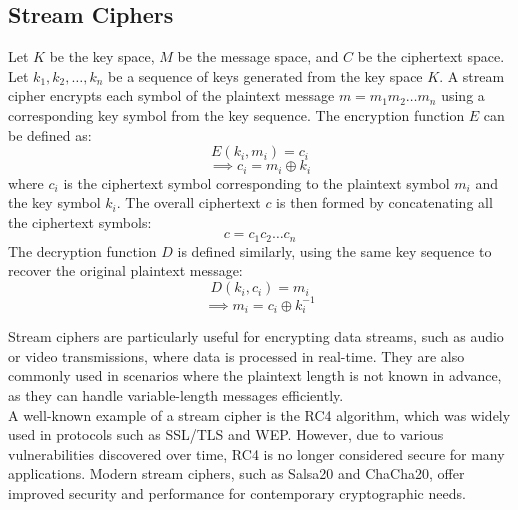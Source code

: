 \documentclass[openany]{book}
\begin{document}
\subsection{Stream Ciphers}
Let $K$ be the key space, $M$ be the message space, and $C$ be the ciphertext space. Let $k_1, k_2, \ldots, k_n$ be a sequence of keys generated from the key space $K$. A stream cipher encrypts each symbol of the plaintext message $m = m_1 m_2 \ldots m_n$ using a corresponding key symbol from the key sequence. The encryption function $E$ can be defined as:
$$ E(k_i, m_i) = c_i $$
$$\implies c_i = m_i \oplus k_i $$
where $c_i$ is the ciphertext symbol corresponding to the plaintext symbol $m_i$ and the key symbol $k_i$. The overall ciphertext $c$ is then formed by concatenating all the ciphertext symbols:
$$ c = c_1 c_2 \ldots c_n $$
The decryption function $D$ is defined similarly, using the same key sequence to recover the original plaintext message:
$$ D(k_i, c_i) = m_i $$
$$\implies m_i = c_i \oplus k^{-1}_i $$
\begin{mynote}
Stream ciphers are particularly useful for encrypting data streams, such as audio or video transmissions, where data is processed in real-time. They are also commonly used in scenarios where the plaintext length is not known in advance, as they can handle variable-length messages efficiently. \\
A well-known example of a stream cipher is the RC4 algorithm, which was widely used in protocols such as SSL/TLS and WEP. However, due to various vulnerabilities discovered over time, RC4 is no longer considered secure for many applications. Modern stream ciphers, such as Salsa20 and ChaCha20, offer improved security and performance for contemporary cryptographic needs.
\end{mynote}
\end{document}
